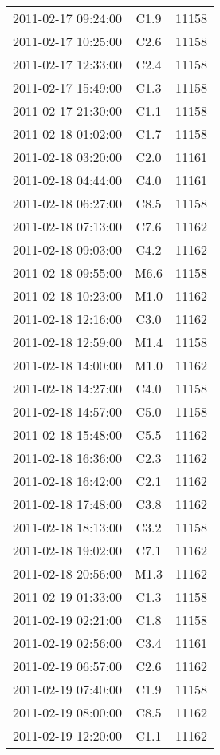 \documentclass{article}
\begin{document}
\begin{table}
\begin{tabular}{c|c|c}
			2011-02-17 09:24:00 & C1.9 & 11158 \\ 
			2011-02-17 10:25:00 & C2.6 & 11158 \\ 
			2011-02-17 12:33:00 & C2.4 & 11158 \\ 
			2011-02-17 15:49:00 & C1.3 & 11158 \\ 
			2011-02-17 21:30:00 & C1.1 & 11158 \\ 
			2011-02-18 01:02:00 & C1.7 & 11158 \\ 
			2011-02-18 03:20:00 & C2.0 & 11161 \\ 
			2011-02-18 04:44:00 & C4.0 & 11161 \\ 
			2011-02-18 06:27:00 & C8.5 & 11158 \\ 
			2011-02-18 07:13:00 & C7.6 & 11162 \\ 
			2011-02-18 09:03:00 & C4.2 & 11162 \\ 
			2011-02-18 09:55:00 & M6.6 & 11158 \\ 
			2011-02-18 10:23:00 & M1.0 & 11162 \\ 
			2011-02-18 12:16:00 & C3.0 & 11162 \\ 
			2011-02-18 12:59:00 & M1.4 & 11158 \\ 
			2011-02-18 14:00:00 & M1.0 & 11162 \\ 
			2011-02-18 14:27:00 & C4.0 & 11158 \\ 
			2011-02-18 14:57:00 & C5.0 & 11158 \\ 
			2011-02-18 15:48:00 & C5.5 & 11162 \\ 
			2011-02-18 16:36:00 & C2.3 & 11162 \\ 
			2011-02-18 16:42:00 & C2.1 & 11162 \\ 
			2011-02-18 17:48:00 & C3.8 & 11162 \\ 
			2011-02-18 18:13:00 & C3.2 & 11158 \\ 
			2011-02-18 19:02:00 & C7.1 & 11162 \\ 
			2011-02-18 20:56:00 & M1.3 & 11162 \\ 
			2011-02-19 01:33:00 & C1.3 & 11158 \\ 
			2011-02-19 02:21:00 & C1.8 & 11158 \\ 
			2011-02-19 02:56:00 & C3.4 & 11161 \\ 
			2011-02-19 06:57:00 & C2.6 & 11162 \\ 
			2011-02-19 07:40:00 & C1.9 & 11158 \\ 
			2011-02-19 08:00:00 & C8.5 & 11162 \\ 
			2011-02-19 12:20:00 & C1.1 & 11162 \\ 

\end{tabular}
\end{table}
\end{document}
